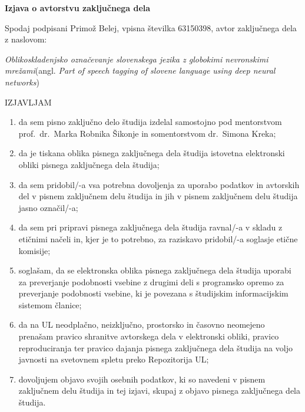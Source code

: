 \documentclass[a4paper, 12pt]{book}
\begin{document}

\pagestyle{empty}
\begin{center}
{\Large\textbf{\sc Izjava o avtorstvu zaključnega dela}}
\end{center}
%
\vspace{1mm}
\noindent Spodaj podpisani Primož Belej, vpisna številka 63150398, avtor zaključnega dela z naslovom:

\vspace{1mm}
\noindent\emph{Oblikoskladenjsko označevanje slovenskega jezika z globokimi nevronskimi mrežami}\hspace{5mm}(angl. \emph{Part of speech tagging of slovene language using deep neural networks})

\vspace{1mm}
\begin{center}IZJAVLJAM\end{center}
\begin{enumerate}
\setlength\itemsep{0mm}
\item da sem pisno zaključno delo študija izdelal samostojno pod mentorstvom prof.\ dr.\ Marka Robnika Šikonje in somentorstvom dr.\ Simona Kreka;
\item da je tiskana oblika pisnega zaključnega dela študija istovetna elektronski obliki pisnega zaključnega dela študija;
\item da sem pridobil/-a vsa potrebna dovoljenja za uporabo podatkov in avtorskih del v pisnem zaključnem delu študija in jih v pisnem zaključnem delu študija jasno označil/-a;
\item da sem pri pripravi pisnega zaključnega dela študija ravnal/-a v skladu z etičnimi načeli in, kjer je to potrebno, za raziskavo pridobil/-a soglasje etične komisije;
\item soglašam, da se elektronska oblika pisnega zaključnega dela študija uporabi za preverjanje podobnosti vsebine z drugimi deli s programsko opremo za preverjanje podobnosti vsebine, ki je povezana s študijskim informacijskim sistemom članice;
\item da na UL neodplačno, neizključno, prostorsko in časovno neomejeno prenašam pravico shranitve avtorskega dela v elektronski obliki, pravico reproduciranja ter pravico dajanja pisnega zaključnega dela študija na voljo javnosti na svetovnem spletu preko Repozitorija UL;
\item dovoljujem objavo svojih osebnih podatkov, ki so navedeni v pisnem zaključnem delu študija in tej izjavi, skupaj z objavo pisnega zaključnega dela študija.
\end{enumerate}
\end{document}
